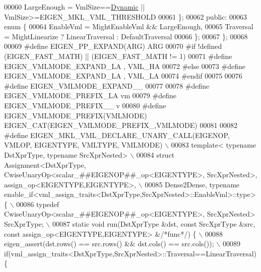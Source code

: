 \begin{DoxyCode}
00060       LargeEnough = VmlSize==\hyperlink{namespace_eigen_ad81fa7195215a0ce30017dfac309f0b2}{Dynamic} || VmlSize>=EIGEN\_MKL\_VML\_THRESHOLD
00061     \};
00062   \textcolor{keyword}{public}:
00063     \textcolor{keyword}{enum} \{
00064       EnableVml = MightEnableVml && LargeEnough,
00065       Traversal = MightLinearize ? LinearTraversal : DefaultTraversal
00066     \};
00067 \};
00068 
00069 \textcolor{preprocessor}{#define EIGEN\_PP\_EXPAND(ARG) ARG}
00070 \textcolor{preprocessor}{#if !defined (EIGEN\_FAST\_MATH) || (EIGEN\_FAST\_MATH != 1)}
00071 \textcolor{preprocessor}{#define EIGEN\_VMLMODE\_EXPAND\_LA , VML\_HA}
00072 \textcolor{preprocessor}{#else}
00073 \textcolor{preprocessor}{#define EIGEN\_VMLMODE\_EXPAND\_LA , VML\_LA}
00074 \textcolor{preprocessor}{#endif}
00075 
00076 \textcolor{preprocessor}{#define EIGEN\_VMLMODE\_EXPAND\_\_ }
00077 
00078 \textcolor{preprocessor}{#define EIGEN\_VMLMODE\_PREFIX\_LA vm}
00079 \textcolor{preprocessor}{#define EIGEN\_VMLMODE\_PREFIX\_\_  v}
00080 \textcolor{preprocessor}{#define EIGEN\_VMLMODE\_PREFIX(VMLMODE) EIGEN\_CAT(EIGEN\_VMLMODE\_PREFIX\_,VMLMODE)}
00081 
00082 \textcolor{preprocessor}{#define EIGEN\_MKL\_VML\_DECLARE\_UNARY\_CALL(EIGENOP, VMLOP, EIGENTYPE, VMLTYPE, VMLMODE)                      
                           \(\backslash\)}
00083 \textcolor{preprocessor}{  template< typename DstXprType, typename SrcXprNested>                                                    
                           \(\backslash\)}
00084 \textcolor{preprocessor}{  struct Assignment<DstXprType, CwiseUnaryOp<scalar\_##EIGENOP##\_op<EIGENTYPE>, SrcXprNested>,
       assign\_op<EIGENTYPE,EIGENTYPE>,   \(\backslash\)}
00085 \textcolor{preprocessor}{                   Dense2Dense, typename
       enable\_if<vml\_assign\_traits<DstXprType,SrcXprNested>::EnableVml>::type> \{              \(\backslash\)}
00086 \textcolor{preprocessor}{    typedef CwiseUnaryOp<scalar\_##EIGENOP##\_op<EIGENTYPE>, SrcXprNested> SrcXprType;                       
                           \(\backslash\)}
00087 \textcolor{preprocessor}{    static void run(DstXprType &dst, const SrcXprType &src, const assign\_op<EIGENTYPE,EIGENTYPE> &}\textcolor{comment}{/*func*/}\textcolor{preprocessor}{)
       \{                   \(\backslash\)}
00088 \textcolor{preprocessor}{      eigen\_assert(dst.rows() == src.rows() && dst.cols() == src.cols());                                  
                           \(\backslash\)}
00089 \textcolor{preprocessor}{      if(vml\_assign\_traits<DstXprType,SrcXprNested>::Traversal==LinearTraversal) \{                         
}
\end{DoxyCode}
